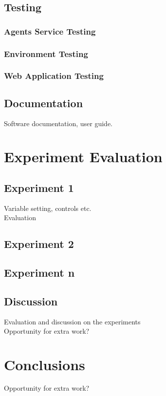 \documentclass[]{final_report}
\begin{document}
\section{Testing}
\subsection{Agents Service Testing}
\subsection{Environment Testing}
\subsection{Web Application Testing}

\section{Documentation}
Software documentation, user guide.

\chapter{Experiment Evaluation}

\section{Experiment 1}
Variable setting, controls etc.\\
Evaluation

\section{Experiment 2}

\section{Experiment n}

\section{Discussion}
Evaluation and discussion on the experiments\\
Opportunity for extra work?

\chapter{Conclusions}
Opportunity for extra work?
\end{document}
